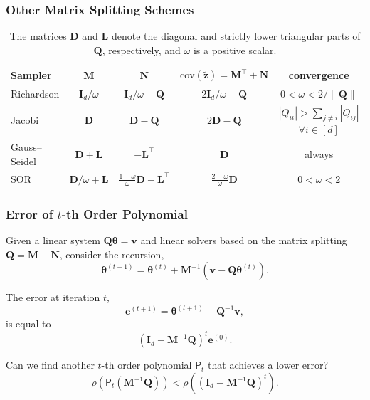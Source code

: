 \documentclass[aspectratio=169]{beamer}
\newcommand{\B}[1]{\mathbf{#1}} %
\newcommand{\Bs}[1]{\boldsymbol{#1}} %
\newcommand{\nr}[1]{\left\|#1\right\|} %
\begin{document}
\begin{frame}
\frametitle{Other Matrix Splitting Schemes}
\begin{table}
{\footnotesize
\caption{The matrices $\B{D}$ and $\B{L}$ denote the diagonal and strictly lower triangular parts of $\B{Q}$, respectively, and $\omega$ is a positive scalar.}
\begin{center}
{\renewcommand{\arraystretch}{1.5}
\begin{tabular}{|l|c|c|c|c|} 
    \hline
    \textbf{Sampler} & $\B{M}$ & $\B{N}$ & $\text{cov}(\tilde{\B{z}}) = \B{M}^{\top} + \B{N}$ & convergence\\
    \hline 
    Richardson & $\B{I}_d/\omega$ & $\B{I}_d/\omega - \B{Q}$ & $2\B{I}_d/\omega - \B{Q}$ & $0 < \omega < 2/\nr{\B{Q}}$\\ 
    Jacobi & $\B{D}$ & $\B{D} - \B{Q}$ & $2\B{D} - \B{Q}$ & $|Q_{ii}| > \sum_{j\neq i}|Q_{ij}|$ $\forall i \in [d]$\\
    Gauss--Seidel & $\B{D} + \B{L}$ & $-\B{L}^{\top}$ & $\B{D}$ & always\\
    SOR & $\B{D}/\omega + \B{L}$ & $\frac{1-\omega}{\omega}\B{D} - \B{L}^{\top}$ & $\frac{2-\omega}{\omega}\B{D}$ & $0 < \omega < 2$\\[1em]
    \hline
\end{tabular}}
\end{center}
}
\end{table}
\end{frame}

\begin{frame}
\frametitle{Error of $t$-th Order Polynomial}
Given a linear system $\B{Q}\Bs{\theta} = \B{v}$ and linear solvers based on the matrix splitting $\B{Q} = \B{M}-\B{N}$, consider the recursion,
\[\Bs{\theta}^{(t+1)} = \Bs{\theta}^{(t)} +  \B{M}^{-1}(\B{v}-\B{Q}\Bs{\theta}^{(t)}).\]

The error at iteration $t$,
\[\B{e}^{(t+1)} = \Bs{\theta}^{(t+1)} - \B{Q}^{-1}\B{v},\]
is equal to 
\[(\B{I}_d-\B{M}^{-1}\B{Q})^t\B{e}^{(0)}.\]

Can we find another $t$-th order polynomial $\mathsf{P}_t$ that achieves a lower error?
\[\rho(\mathsf{P}_t(\B{M}^{-1}\B{Q})) < \rho((\B{I}_d-\B{M}^{-1}\B{Q})^t).\]
\end{frame}
\end{document}

